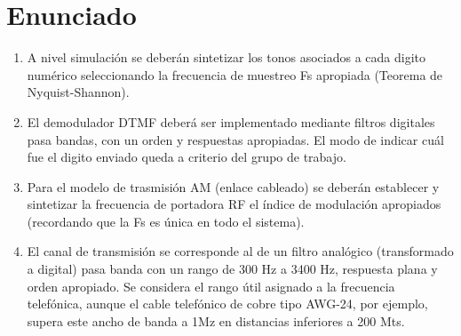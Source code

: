 \section{Enunciado}
\begin{enumerate}[label=\alph*)]
  \item A nivel simulación se deberán sintetizar
        los tonos asociados a cada digito
        numérico seleccionando la frecuencia
        de muestreo Fs apropiada (Teorema de Nyquist-Shannon).
  \item El demodulador DTMF deberá ser
        implementado mediante filtros
        digitales pasa bandas, con un
        orden y respuestas apropiadas. El
        modo de indicar cuál fue el digito
        enviado queda a criterio del grupo
        de trabajo.
  \item Para el modelo de trasmisión AM
        (enlace cableado) se deberán
        establecer y sintetizar la frecuencia
        de portadora RF el índice de
        modulación apropiados
        (recordando que la Fs es única en
        todo el sistema).
  \item El canal de transmisión se
        corresponde al de un filtro
        analógico (transformado a digital)
        pasa banda con un rango de 300 Hz
        a 3400 Hz, respuesta plana y orden
        apropiado. Se considera el rango
        útil asignado a la frecuencia
        telefónica, aunque el cable
        telefónico de cobre tipo AWG-24,
        por ejemplo, supera este ancho de
        banda a 1Mz en distancias
        inferiores a 200 Mts.
\end{enumerate}

